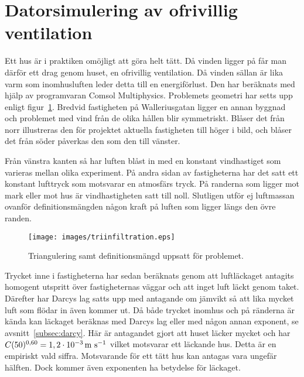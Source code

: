 \section{Datorsimulering av ofrivillig ventilation}

Ett hus är i praktiken omöjligt att göra helt tätt. Då vinden ligger på
får man därför ett drag genom huset, en ofrivillig ventilation. Då vinden
sällan är lika varm som inomhusluften leder detta till en energiförlust.
Den har beräknats med hjälp av programvaran Comsol Multiphysics. Problemets geometri har
setts upp enligt figur~\ref{fig:windmethod:tri}. Bredvid fastigheten på Walleriusgatan ligger en annan byggnad och problemet med vind från de olika hållen blir symmetriskt. Blåser det från norr illustreras den för projektet aktuella fastigheten till höger i bild, och blåser det från söder påverkas den som den till vänster.

Från vänstra kanten så har luften blåst in med en konstant vindhastiget som varieras mellan olika
experiment. På andra sidan av fastigheterna har det satt ett konstant lufttryck som motsvarar en
atmosfärs tryck. På randerna som ligger mot mark eller mot hus är vindhastigheten satt till noll.
Slutligen utför ej luftmassan ovanför definitionsmängden någon kraft på luften som ligger längs den
övre randen.

\begin{figure}
\centering
\texttt{[image: images/triinfiltration.eps]}
\caption{Triangulering samt definitionsmängd uppsatt för problemet.}\label{fig:windmethod:tri}
\end{figure}

Trycket inne i fastigheterna har sedan beräknats genom att luftläckaget antagits homogent utspritt över fastigheternas
väggar och att inget luft läckt genom taket. Därefter har Darcys lag satts upp med antagande om jämvikt så att lika mycket
luft som flödar in även kommer ut. Då både trycket inomhus och på ränderna är kända kan läckaget beräknas med Darcys lag
eller med någon annan exponent, se avsnitt~\ref{subsec:darcy}. Här är antagandet gjort att huset läcker mycket och har $C(50)^{0,60} = \unit[1,2\cdot 10^{-3}]{m~s^{-1}}$ vilket motsvarar ett läckande hus. Detta
är en empiriskt vald siffra. Motsvarande för ett tätt hus kan antagas vara ungefär hälften.
Dock kommer även exponenten ha betydelse för läckaget.\cite{sasic}

